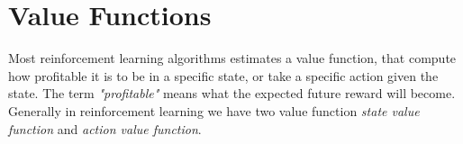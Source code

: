 \documentclass[11pt]{article}
\begin{document}
\section{Value Functions}

Most reinforcement learning algorithms estimates a value function,
that compute how profitable it is to be in a specific state,
or take a specific action given the state.
The term \textit{"profitable"} means what the expected future reward will become.
Generally in reinforcement learning we have two value function
\textit{state value function} and \textit{action value function}.





%
%
\end{document}
